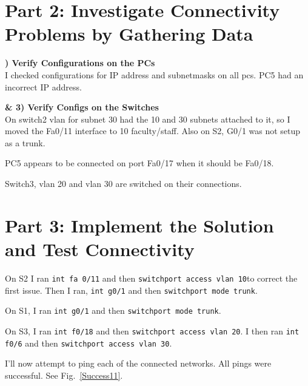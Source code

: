 \documentclass{report}
\newcommand{\mysection}[1]{\section*{#1}}
\newcommand{\mysubsection}[2]{\textbf{\romannumeral #1) #2}}
\begin{document}
\mysection{\textbf{Part 2: Investigate Connectivity Problems by Gathering Data}}

\mysubsection{1}{Verify Configurations on the PCs}
\\I checked configurations for IP address and subnetmasks on all pcs. 
PC5 had an incorrect IP address.

\noindent\mysubsection{2 \& 3}{Verify Configs on the Switches}
\\On switch2 vlan for subnet 30 had the 10 and 30 subnets attached to it, so I
moved the Fa0/11 interface to 10 faculty/staff. Also on S2, G0/1 was not setup
as a trunk.

PC5 appears to be connected on port Fa0/17 when it should be Fa0/18.

Switch3, vlan 20 and vlan 30 are switched on their connections.


\mysection{\textbf{Part 3: Implement the Solution and Test Connectivity}}

On S2 I ran {\scriptsize{\verb$int fa 0/11$}\normalsize} and then
{\scriptsize{\verb$switchport access vlan 10$}\normalsize}to correct the first
issue.
Then I ran, {\scriptsize{\verb$int g0/1$}\normalsize} and then
{\scriptsize{\verb$switchport mode trunk$}\normalsize}. 

On S1, I ran {\scriptsize{\verb$int g0/1$}\normalsize} and then
{\scriptsize{\verb$switchport mode trunk$}\normalsize}.

On S3, I ran {\scriptsize{\verb$int f0/18$}\normalsize} and then
{\scriptsize{\verb$switchport access vlan 20$}\normalsize}.
I then ran {\scriptsize{\verb$int f0/6$}\normalsize} and then
{\scriptsize{\verb$switchport access vlan 30$}\normalsize}.

I'll now attempt to ping each of the connected networks.
All pings were successful. See Fig.~\ref{Success11}.
\end{document}
